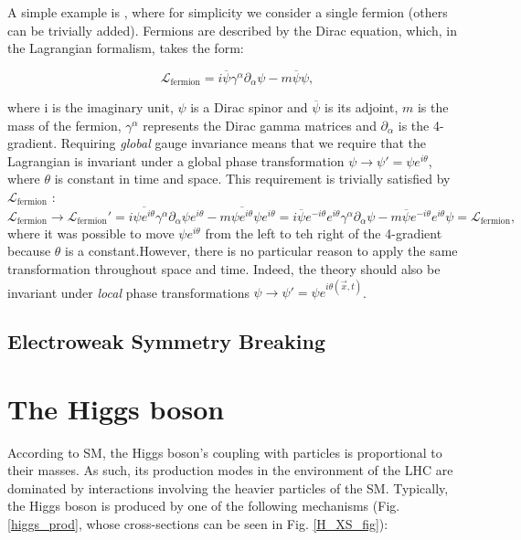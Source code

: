 A simple example is \QED, where for simplicity we consider a single fermion (others can be trivially added). Fermions are described by the Dirac equation, which, in the Lagrangian formalism, takes the form:

\begin{equation}
\label{eq:th:dirac}
\mathcal{L}_{\textrm{fermion}} = i\overline{\psi} \gamma^{\alpha} \partial_{\alpha} \psi - m\overline{\psi}\psi,
\end{equation}

where i is the imaginary unit, $\psi$ is a Dirac spinor and $\overline{\psi}$ is its adjoint, $m$ is the mass of the fermion, $\gamma^{\alpha}$ represents the Dirac gamma matrices and $\partial_{\alpha}$ is the 4-gradient. 
Requiring \emph{global} gauge invariance means that we require that the Lagrangian is invariant under a global phase transformation $\psi \rightarrow \psi'= \psi e^{i\theta}$, where $\theta$ is constant in time and space. This requirement is trivially satisfied by $\mathcal{L}_{\textrm{fermion}}$ :
$$
\mathcal{L}_{\textrm{fermion}} \rightarrow \mathcal{L}_{\textrm{fermion}}'=i\overline{\psi e^{i\theta}} \gamma^{\alpha} \partial_{\alpha} \psi e^{i\theta} - m\overline{\psi e^{i\theta}}\psi e^{i\theta}  =i \overline{\psi } e^{-i\theta} e^{i\theta}\gamma^{\alpha} \partial_{\alpha} \psi - m\overline{\psi} e^{-i\theta} e^{i\theta}\psi  = \mathcal{L}_{\textrm{fermion}},
$$
where it was possible to move $\psi e^{i\theta}$ from the left to teh right of the 4-gradient because $\theta$ is a constant.However, there is no particular reason to apply the same transformation throughout space and time. Indeed, the theory should also be invariant under \emph{local} phase transformations $\psi \rightarrow \psi'= \psi e^{i\theta(\vec{x},t)}$.


\subsection{Electroweak Symmetry Breaking}
\label{sec:th:ewsb}

\section{The Higgs boson}
According to SM, the Higgs boson's coupling with particles is proportional to their masses. As such, its production modes in the environment of the LHC are dominated by interactions involving the heavier particles of the SM. Typically, the Higgs boson is produced by one of the following mechanisms (Fig. \ref{higgs_prod}, whose cross-sections can be seen in Fig. \ref{H_XS_fig}):

